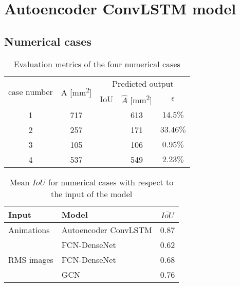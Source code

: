 \section{Autoencoder ConvLSTM model}
\label{sec53}

\subsection{Numerical cases}
\label{sec531}

\begin{table}[]
	\centering
	\caption{Evaluation metrics of the four numerical cases}
	\begin{tabular}{ccccc}
		\toprule
		\multirow{2}{*}{case number} & \multicolumn{1}{c}{\multirow{2}{*}{A [mm\textsuperscript{2}]}} & \multicolumn{3}{c}{Predicted output} \\ 
		\cmidrule(lr){3-5} & & \multicolumn{1}{c}{IoU} & \multicolumn{1}{c}{\(\hat{A}\) [mm\textsuperscript{2}]} & \(\epsilon\) \\
		\midrule
		1 & 717 & \multicolumn{1}{c}{} & \multicolumn{1}{c}{613} & \(14.5\%\) \\ 
		2 & 257 & \multicolumn{1}{c}{} & \multicolumn{1}{c}{171} & \(33.46\%\) \\ 
		3 & 105 & \multicolumn{1}{c}{} & \multicolumn{1}{c}{106} & \(0.95\%\) \\ 
		4 & 537 & \multicolumn{1}{c}{} & \multicolumn{1}{c}{549} & \(2.23\%\) \\ 
		\bottomrule
	\end{tabular}	
	\label{tab:num_cases}
\end{table}
\begin{table}[]
	\centering
	\caption{Mean \(IoU\) for numerical cases with respect to the input of the model}
	\begin{tabular}{llc}
		\toprule
		Input & Model & \(\overline{IoU}\) \\ 
		\midrule
		Animations & Autoencoder ConvLSTM & 0.87 \\ 
		\midrule
		\multirow{3}{*}{RMS images}  
		& FCN-DenseNet~\cite{Ijjeh2021} & 0.62   \\
		& FCN-DenseNet~\cite{Ijjeh2022} & 0.68   \\
		& GCN~\cite{Ijjeh2022}          & 0.76   \\ 
		\bottomrule
	\end{tabular}
	\label{tab:meanIoU_vs_input}
\end{table}
